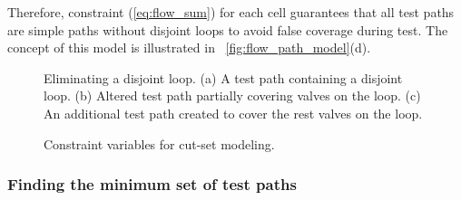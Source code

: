 Therefore, constraint (\ref{eq:flow_sum}) for each cell guarantees that all
test paths are simple paths without disjoint loops to avoid false coverage
during test. The concept of 
this model is illustrated in \figname~\ref{fig:flow_path_model}(d).

\begin{figure*}[t]
{
\figurefontsize
  \begin{minipage}[b]{0.70\textwidth}
\centering

\caption{Eliminating a disjoint loop. (a) A test path containing a disjoint loop.  (b) Altered test path partially covering valves on the loop. (c) An additional test path created to cover the rest valves on the loop.}
\label{fig:minimum_loops}
\end{minipage}
\hspace{10pt}
  \begin{minipage}[b]{0.28\textwidth}
\hskip 30pt
\vspace{10pt}
    \caption{Constraint variables for cut-set modeling.}
    \label{fig:cut_var}
  \end{minipage}
}
\end{figure*}

\subsubsection{Finding the minimum set of test paths} 

